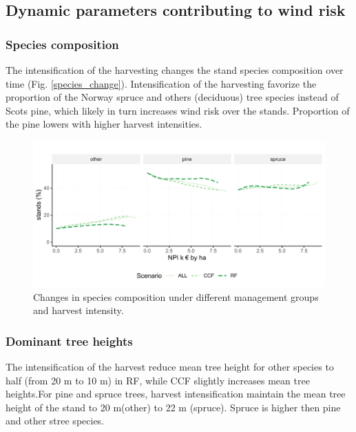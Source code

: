 \documentclass[]{elsarticle} %
\makeatletter
\def\maxwidth{\ifdim\Gin@nat@width>\linewidth\linewidth
\else\Gin@nat@width\fi}
\let\Oldincludegraphics\includegraphics
\renewcommand{\includegraphics}[1]{\Oldincludegraphics[width=\maxwidth]{#1}}
\makeatother
\begin{document}
\subsection{Dynamic parameters contributing to wind
risk}\label{dynamic-parameters-contributing-to-wind-risk}

\subsubsection{Species composition}\label{species-composition}

The intensification of the harvesting changes the stand species
composition over time (Fig. \ref{species_change}). Intensification of
the harvesting favorize the proportion of the Norway spruce and others
(deciduous) tree species instead of Scots pine, which likely in turn
increases wind risk over the stands. Proportion of the pine lowers with
higher harvest intensities.

\begin{figure}
\centering
\includegraphics{test_manus_files/figure-latex/species_change-1.pdf}
\caption{Changes in species composition under different management
groups and harvest intensity.}
\end{figure}

\subsubsection{Dominant tree heights}\label{dominant-tree-heights}

The intensification of the harvest reduce mean tree height for other
species to half (from 20 m to 10 m) in RF, while CCF slightly increases
mean tree heights.For pine and spruce trees, harvest intensification
maintain the mean tree height of the stand to 20 m(other) to 22 m
(spruce). Spruce is higher then pine and other stree species.
\end{document}
